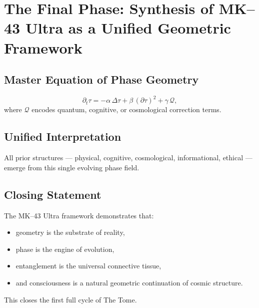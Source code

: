 \chapter{The Final Phase: Synthesis of MK--43 Ultra as a Unified Geometric Framework}

\section{Master Equation of Phase Geometry}
\[
\partial_t \tau = -\alpha\,\Delta\tau + \beta\,(\partial\tau)^2 + \gamma\,\mathcal{Q},
\]
where \(\mathcal{Q}\) encodes quantum, cognitive, or cosmological correction terms.

\section{Unified Interpretation}
All prior structures --- physical, cognitive, cosmological, informational, ethical --- emerge from this single evolving phase field.

\section{Closing Statement}
The MK--43 Ultra framework demonstrates that:
\begin{itemize}
  \item geometry is the substrate of reality,
  \item phase is the engine of evolution,
  \item entanglement is the universal connective tissue,
  \item and consciousness is a natural geometric continuation of cosmic structure.
\end{itemize}
This closes the first full cycle of The Tome.
